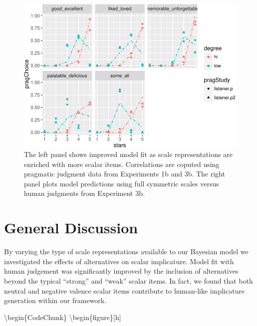\documentclass[10pt, letterpaper]{article}
\newenvironment{CodeChunk}{}{}
\begin{document}
\begin{CodeChunk}
\begin{figure}[t]

{\centering \includegraphics{figs/performancePlots-1} 

}

\caption[The left panel shows improved model fit as scale representations are enriched with more scalar items]{The left panel shows improved model fit as scale representations are enriched with more scalar items. Correlations are coputed using pragmatic judgment data from Experiments 1b and 3b. The right panel plots model predictions using full symmetric scales versus human judgments from Experiment 3b.}\label{fig:performancePlots}
\end{figure}
\end{CodeChunk}

\section{General Discussion}\label{general-discussion}

By varying the type of scale representations available to our Bayesian
model we investigated the effects of alternatives on scalar implicature.
Model fit with human judgement was significantly improved by the
inclusion of alternatives beyond the typical ``strong'' and ``weak''
scalar items. In fact, we found that both neutral and negative valence
scalar items contribute to human-like implicature generation within our
framework.

\textbackslash{}begin\{CodeChunk\}
\textbackslash{}begin\{figure\}{[}h{]}
\end{document}
